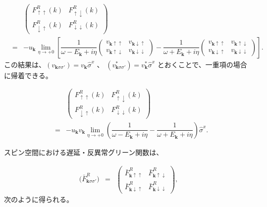 \documentclass[uplatex,a4j,12pt,dvipdfmx]{jsarticle}
\begin{document}
\begin{eqnarray}
	&&
	\left(
	\begin{array}{cc}
			F_{\uparrow \uparrow}^{R}(k)   & F_{\uparrow \downarrow}^{R}(k)   \\[3mm]
			F_{\downarrow \uparrow}^{R}(k) & F_{\downarrow \downarrow}^{R}(k)
		\end{array}
	\right)
	\nonumber \\ &=&
	-
	u_{ \bm{k} }
	\lim_{\eta \to +0}
	\left[
		\dfrac{ 1 }{ \omega - E_{\bm{k}} + i \eta }
		\left(
		\begin{array}{cc}
				v_{ \bm{k} \uparrow \uparrow }
				 &
				v_{ \bm{k} \downarrow \uparrow }
				\\[3mm]
				v_{ \bm{k} \uparrow \downarrow }
				 &
				v_{ \bm{k} \downarrow \downarrow }
			\end{array}
		\right)
		-
		\dfrac{ 1 }{ \omega + E_{\bm{k}} + i \eta }
		\left(
		\begin{array}{cc}
				v_{ \bm{k} \uparrow \uparrow }
				 &
				v_{ \bm{k} \uparrow \downarrow }
				\\[3mm]
				v_{ \bm{k} \downarrow \uparrow }
				 &
				v_{ \bm{k} \downarrow \downarrow }
			\end{array}
		\right)
		\right]
	.
\end{eqnarray}
%
この結果は、$(v_{\bm{k} \sigma \sigma'}) = v_{\bm{k}} \hat{\sigma}^{x}$
、
$(v_{\bm{k} \sigma \sigma'}^{*}) = v_{\bm{k}}^{*} \hat{\sigma}^{x}$
とおくことで、一重項の場合に帰着できる。

\begin{eqnarray}
	&&
	\left(
	\begin{array}{cc}
			F_{\uparrow \uparrow}^{R}(k)   & F_{\uparrow \downarrow}^{R}(k)   \\[3mm]
			F_{\downarrow \uparrow}^{R}(k) & F_{\downarrow \downarrow}^{R}(k)
		\end{array}
	\right)
	\nonumber \\ &=&
	-
	u_{ \bm{k} }
	v_{ \bm{k} }
	\lim_{\eta \to +0}
	\left(
	\dfrac{ 1 }{ \omega - E_{\bm{k}} + i \eta }
	-
	\dfrac{ 1 }{ \omega + E_{\bm{k}} + i \eta }
	\right)
	\hat{\sigma}^{x}
	.
\end{eqnarray}
%

${}$スピン空間における遅延・反異常グリーン関数は、

\begin{eqnarray}
	\Big(
	\bar{F}_{\bm{k} \sigma \sigma'}^{R}
	\Big)
	&=&
	\left(
	\begin{array}{cc}
			\bar{F}_{\bm{k} \uparrow \uparrow}^{R}   & \bar{F}_{\bm{k} \uparrow \downarrow}^{R}   \\[3mm]
			\bar{F}_{\bm{k} \downarrow \uparrow}^{R} & \bar{F}_{\bm{k} \downarrow \downarrow}^{R}
		\end{array}
	\right)
	,
\end{eqnarray}
%
次のように得られる。
\end{document}
